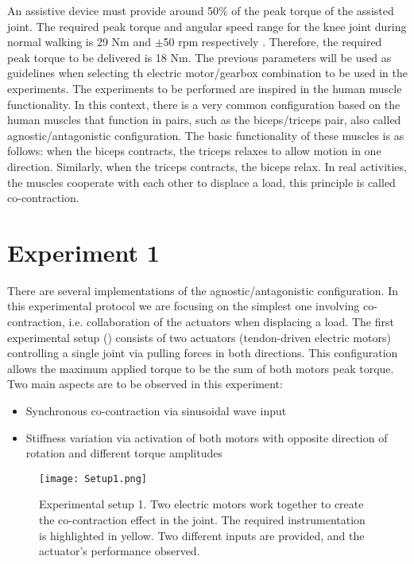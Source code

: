 An assistive device must provide around 50\% of the peak torque of the assisted joint. The required peak torque and angular speed range for the knee joint during normal walking is 29 Nm and $\pm$50 rpm respectively \cite{dos2014impedance,winter2009biomechanics}. Therefore, the required peak torque to be delivered is 18 Nm. The previous parameters will be used as guidelines when selecting th electric motor/gearbox combination to be used in the experiments.
The experiments to be performed are inspired in the human muscle functionality. In this context, there is a very common configuration based on the human muscles that function in pairs, such as the biceps/triceps pair, also called agnostic/antagonistic configuration. The basic functionality of these muscles is as follows: when the biceps contracts, the triceps relaxes to allow motion in one direction. Similarly, when the triceps contracts, the biceps relax. In real activities, the muscles cooperate with each other to displace a load, this principle is called co-contraction.


\section{Experiment 1}

There are several implementations of the agnostic/antagonistic configuration. In this experimental protocol we are focusing on the simplest one involving co-contraction, i.e. collaboration of the actuators when displacing a load. The first experimental setup () consists of two actuators (tendon-driven electric motors) controlling a single joint via pulling forces in both directions. This configuration allows the maximum applied torque to be the sum of both motors peak torque. Two main aspects are to be observed in this experiment: 

\begin{itemize}
    \item Synchronous co-contraction via sinusoidal wave input
    \item Stiffness variation via activation of both motors with opposite direction of rotation and different torque amplitudes
\end{itemize}

\begin{figure}[hbt!]
    \centering
    \texttt{[image: Setup1.png]}
    \caption{Experimental setup 1. Two electric motors work together to create the co-contraction effect in the joint. The required instrumentation is highlighted in yellow. Two different inputs are provided, and the actuator's performance observed.}
    \label{fig:setup1}
\end{figure}

